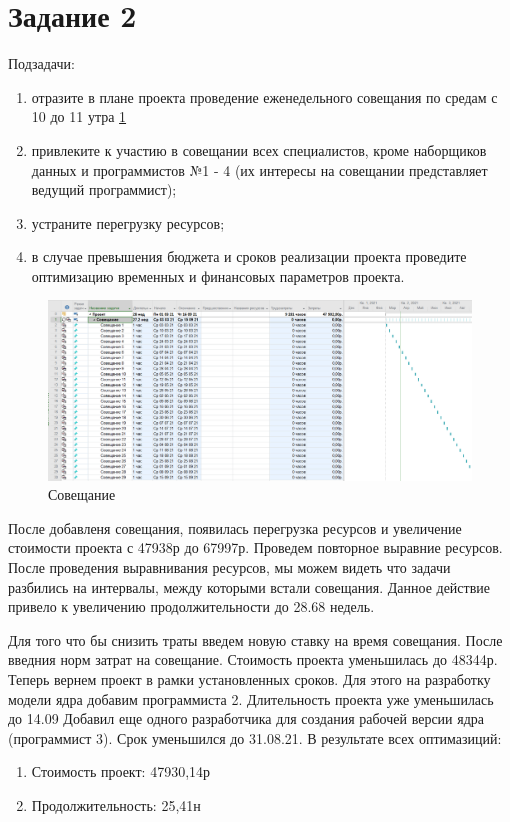 \section{Задание 2}
Подзадачи:
\begin{enumerate}
	\item отразите в плане проекта проведение еженедельного совещания по
	средам с 10 до 11 утра \ref{fig:lab321}
	\item привлеките к участию в совещании всех специалистов, кроме
	наборщиков данных и программистов №1 - 4 (их интересы на совещании
	представляет ведущий программист);
	\item устраните перегрузку ресурсов;
	\item в случае превышения бюджета и сроков реализации проекта проведите
	оптимизацию временных и финансовых параметров проекта.
\end{enumerate}

\begin{figure}[h]
	\centering
	\includegraphics[width=0.7\linewidth]{src/lab3_2_1}
	\caption{Совещание}
	\label{fig:lab321}
\end{figure}

После добавленя совещания, появилась перегрузка ресурсов и увеличение стоимости проекта с 47938р до 67997р.
Проведем повторное выравние ресурсов.
После проведения выравнивания ресурсов, мы можем видеть что задачи разбились на интервалы, между которыми встали совещания.
Данное действие привело к увеличению продолжительности до 28.68 недель.

Для того что бы снизить траты введем новую ставку на время совещания.
После введния норм затрат на совещание. Стоимость проекта уменьшилась до 48344р.
Теперь вернем проект в рамки установленных сроков.
Для этого на разработку модели ядра добавим программиста 2. Длительность проекта уже уменьшилась до 14.09
Добавил еще одного разработчика для создания рабочей версии ядра (программист 3). Срок уменьшился до 31.08.21.
В результате всех оптимазиций:
\begin{enumerate}
	\item Стоимость проект: 47930,14р
	\item Продолжительность: 25,41н 
\end{enumerate}

